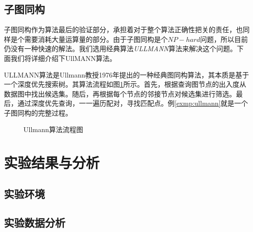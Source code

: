 \documentclass{XDBAthesis}
\numberwithin{algorithm}{chapter}
\begin{document}
\subsection{子图同构}
子图同构作为算法最后的验证部分，承担着对于整个算法正确性把关的责任，也同样是个需要消耗大量运算量的部分。由于子图同构是个$NP-hard$问题，所以目前仍没有一种快速的解法。我们选用经典算法\emph{ULLMANN}算法\cite{ullmann}来解决这个问题。下面我们将详细介绍下UllMANN算法。

ULLMANN算法是Ullmann教授1976年提出的一种经典图同构算法，其本质是基于一个深度优先搜索树。其算法流程如图\ref{fg:ullmanchart}所示。首先，根据查询图节点的出入度从数据图中找出候选集。随后，再根据每个节点的邻接节点对候选集进行筛选。最后，通过深度优先查询，一一遍历配对，寻找匹配点。例\ref{exmp:ullmann}就是一个子图同构的完整过程。
\begin{figure}
    \caption{Ullmann算法流程图}
    \label{fg:ullmanchart}
\end{figure}
\begin{exmp}
    \label{exmp:ullmann}    
\end{exmp}


\section{实验结果与分析}
\subsection{实验环境}
\subsection{实验数据分析}


\ifx\allfiles\undefined


\end{document}
